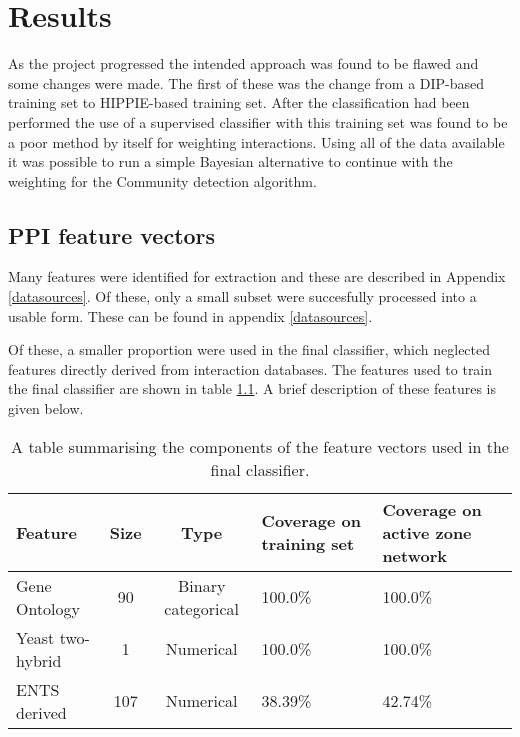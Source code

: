 \chapter{Results}
\label{results}


As the project progressed the intended approach was found to be flawed and some changes were made.
The first of these was the change from a DIP-based training set to HIPPIE-based training set.
After the classification had been performed the use of a supervised classifier with this training set was found to be a poor method by itself for weighting interactions.
Using all of the data available it was possible to run a simple Bayesian alternative to continue with the weighting for the Community detection algorithm.

\section{PPI feature vectors}

Many features were identified for extraction and these are described in Appendix \ref{datasources}.
Of these, only a small subset were succesfully processed into a usable form.
These can be found in appendix \ref{datasources}.

Of these, a smaller proportion were used in the final classifier, which neglected features directly derived from interaction databases.
The features used to train the final classifier are shown in table \ref{tab:features}.
A brief description of these features is given below.

\begin{table}
    \centering
    \small
    \begin{tabular}{l c c p{} p{}}
        Feature         &   Size &  Type                &  Coverage on training set &  Coverage on active zone network \\
        \hline
        Gene Ontology    &  90   &  Binary categorical  &  100.0\%                  & 100.0\%                          \\
        Yeast two-hybrid &  1    &  Numerical           &  100.0\%                  & 100.0\%                          \\
        ENTS derived     &  107  &  Numerical           &  38.39\%                  & 42.74\%                          \\
    \end{tabular}
    \caption{A table summarising the components of the feature vectors used in the final classifier.}
    \label{tab:features}
\end{table}

